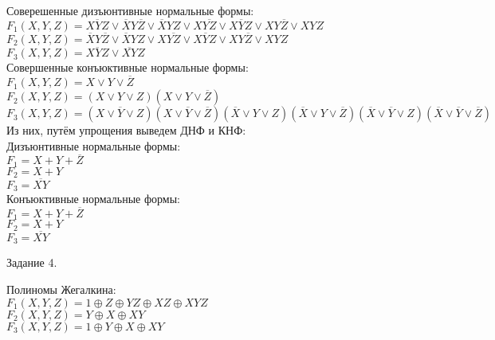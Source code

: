 \documentclass[a4paper,12pt]{report} %
\begin{document}
\begin{flushleft}
	Соверешенные дизъюнтивные нормальные формы:\\
	$F_1(X,Y,Z)=\overline{XYZ} \vee \overline{X}Y\overline{Z} \vee \overline{X}YZ \vee X\overline{YZ} \vee X\overline{Y}Z \vee XY\overline{Z} \vee XYZ$\\
	$F_2(X,Y,Z)=\overline{X}Y\overline{Z} \vee \overline{X}YZ \vee X\overline{YZ} \vee X\overline{Y}Z \vee XY\overline{Z} \vee XYZ$\\
	$F_3(X,Y,Z)=\overline{XYZ} \vee \overline{XY}Z$\\
	\bigskip
	Совершенные конъюктивные нормальные формы:\\
	$F_1(X,Y,Z)=X \vee Y \vee \overline{Z}$\\
	$F_2(X,Y,Z)=(X\vee Y\vee Z)(X\vee Y\vee\overline{Z})$\\
	$F_3(X,Y,Z)=(X\vee \overline{Y}\vee Z)(X \vee \overline{Y} \vee \overline{Z})(\overline{X} \vee Y \vee Z)(\overline{X} \vee Y \vee \overline{Z})(\overline{X} \vee \overline{Y} \vee Z)(\overline{X} \vee \overline{Y} \vee \overline{Z})$\\
	Из них, путём упрощения выведем ДНФ и КНФ:\\
	Дизъюнтивные нормальные формы:\\
	$F_1 = X + Y + \overline{Z}$\\
	$F_2 = X + Y$\\
	$F_3 = \overline{XY}$\\
	Конъюктивные нормальные формы:\\
	$F_1 = X + Y + \overline{Z}$\\
	$F_2 = X + Y$\\
	$F_3 = \overline{XY}$\\
\end{flushleft}

\bigskip


\begin{center}
	Задание 4.\\
\end{center}

\begin{flushleft}
	Полиномы Жегалкина:\\
	$F_1(X,Y,Z)=1 \oplus Z \oplus YZ \oplus XZ \oplus XYZ$\\
	$F_2(X,Y,Z)=Y \oplus X \oplus XY$\\
	$F_3(X,Y,Z)=1 \oplus Y \oplus X \oplus XY$\\
\end{flushleft}
\end{document}
